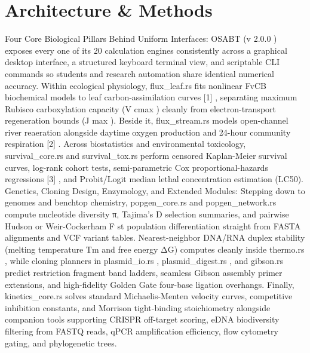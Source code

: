 \documentclass[10pt,letterpaper]{article}
\begin{document}
\section{Architecture \& Methods}
Four Core Biological Pillars Behind Uniform Interfaces: OSABT (v 2.0.0 ) exposes every one of its 20 calculation engines consistently across a graphical desktop interface, a structured keyboard terminal view, and scriptable CLI commands so students and research automation share identical numerical accuracy. Within ecological physiology, flux\_leaf.rs fits nonlinear FvCB biochemical models to leaf carbon-assimilation curves [1] , separating maximum Rubisco carboxylation capacity (V cmax ) cleanly from electron-transport regeneration bounds (J max ). Beside it, flux\_stream.rs models open-channel river reaeration alongside daytime oxygen production and 24-hour community respiration [2] . Across biostatistics and environmental toxicology, survival\_core.rs and survival\_tox.rs perform censored Kaplan-Meier survival curves, log-rank cohort tests, semi-parametric Cox proportional-hazards regressions [3] , and Probit/Logit median lethal concentration estimation (LC50). Genetics, Cloning Design, Enzymology, and Extended Modules: Stepping down to genomes and benchtop chemistry, popgen\_core.rs and popgen\_network.rs compute nucleotide diversity π, Tajima's D selection summaries, and pairwise Hudson or Weir-Cockerham F st population differentiation straight from FASTA alignments and VCF variant tables. Nearest-neighbor DNA/RNA duplex stability (melting temperature Tm and free energy ΔG) computes cleanly inside thermo.rs , while cloning planners in plasmid\_io.rs , plasmid\_digest.rs , and gibson.rs predict restriction fragment band ladders, seamless Gibson assembly primer extensions, and high-fidelity Golden Gate four-base ligation overhangs. Finally, kinetics\_core.rs solves standard Michaelis-Menten velocity curves, competitive inhibition constants, and Morrison tight-binding stoichiometry alongside companion tools supporting CRISPR off-target scoring, eDNA biodiversity filtering from FASTQ reads, qPCR amplification efficiency, flow cytometry gating, and phylogenetic trees.
\end{document}
